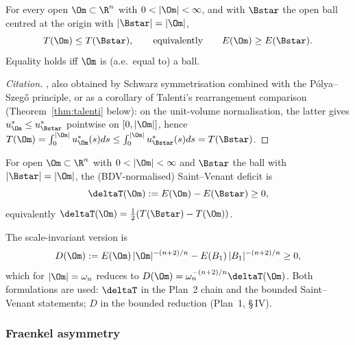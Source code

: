 \begin{theorem}\label{thm:SVclass}
For every open $\Om\subset\R^n$ with $0<|\Om|<\infty$, and with
$\Bstar$ the open ball centred at the origin with $|\Bstar|=|\Om|$,
\begin{equation}\label{eq:SVclass}
   T(\Om)\le T(\Bstar),
   \qquad\text{equivalently}\qquad
   E(\Om)\ge E(\Bstar).
\end{equation}
Equality holds iff $\Om$ is (a.e.\ equal to) a ball.
\end{theorem}

\begin{proof}[Citation]
\cite[Thm.~1.1]{PolyaSzego1951}, also obtained by Schwarz symmetrisation
combined with the P\'olya--Szeg\H{o} principle, or as a corollary of
Talenti's rearrangement comparison (Theorem~\ref{thm:talenti}
below): on the unit-volume normalisation, the latter gives
$u^*_\Om\le u^*_{\Bstar}$ pointwise on $[0,|\Om|]$, hence
$T(\Om)=\int_0^{|\Om|}u^*_\Om(s)ds\le\int_0^{|\Om|}u^*_{\Bstar}(s)ds=T(\Bstar)$.
\end{proof}

\begin{definition}\label{def:deltaT}
For open $\Om\subset\R^n$ with $0<|\Om|<\infty$ and $\Bstar$ the
ball with $|\Bstar|=|\Om|$, the (BDV-normalised) Saint--Venant
deficit is
\begin{equation}\label{eq:deltaT-def}
   \deltaT(\Om):=E(\Om)-E(\Bstar)\ge 0,
\end{equation}
equivalently $\deltaT(\Om)=\tfrac12(T(\Bstar)-T(\Om))$.
\end{definition}

\begin{remark}\label{rem:Dform}
The scale-invariant version is
\begin{equation}\label{eq:Dform}
   D(\Om):=E(\Om)\,|\Om|^{-(n+2)/n}-E(B_1)\,|B_1|^{-(n+2)/n}\ge 0,
\end{equation}
which for $|\Om|=\omega_n$ reduces to
$D(\Om)=\omega_n^{-(n+2)/n}\deltaT(\Om)$.
Both formulations are
used: $\deltaT$ in the Plan~2 chain and the bounded Saint--Venant
statements; $D$ in the bounded reduction (Plan~1, \S\,IV).
\end{remark}

\subsubsection{Fraenkel asymmetry}\label{ssec:Fraenkel}

